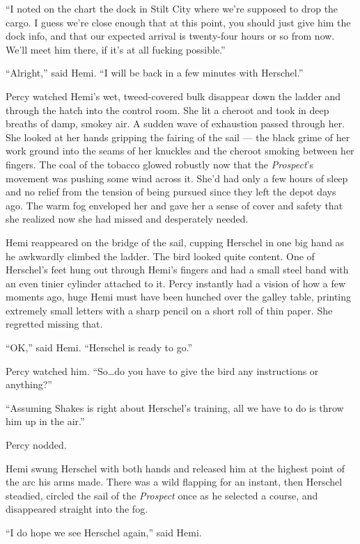 \documentclass[
]{scrbook}
\begin{document}
``I noted on the chart the dock in Stilt City where we're supposed to
drop the cargo. I guess we're close enough that at this point, you
should just give him the dock info, and that our expected arrival is
twenty-four hours or so from now. We'll meet him there, if it's at all
fucking possible.''

``Alright,'' said Hemi. ``I will be back in a few minutes with
Herschel.''

Percy watched Hemi's wet, tweed-covered bulk disappear down the ladder
and through the hatch into the control room. She lit a cheroot and took
in deep breaths of damp, smokey air. A sudden wave of exhaustion passed
through her. She looked at her hands gripping the fairing of the sail
--- the black grime of her work ground into the seams of her knuckles
and the cheroot smoking between her fingers. The coal of the tobacco
glowed robustly now that the \emph{Prospect}'s movement was pushing some
wind across it. She'd had only a few hours of sleep and no relief from
the tension of being pursued since they left the depot days ago. The
warm fog enveloped her and gave her a sense of cover and safety that she
realized now she had missed and desperately needed.

Hemi reappeared on the bridge of the sail, cupping Herschel in one big
hand as he awkwardly climbed the ladder. The bird looked quite content.
One of Herschel's feet hung out through Hemi's fingers and had a small
steel band with an even tinier cylinder attached to it. Percy instantly
had a vision of how a few moments ago, huge Hemi must have been hunched
over the galley table, printing extremely small letters with a sharp
pencil on a short roll of thin paper. She regretted missing that.

``OK,'' said Hemi. ``Herschel is ready to go.''

Percy watched him. ``So\ldots do you have to give the bird any
instructions or anything?''

``Assuming Shakes is right about Herschel's training, all we have to do
is throw him up in the air.''

Percy nodded.

Hemi swung Herschel with both hands and released him at the highest
point of the arc his arms made. There was a wild flapping for an
instant, then Herschel steadied, circled the sail of the \emph{Prospect}
once as he selected a course, and disappeared straight into the fog.

``I do hope we see Herschel again,'' said Hemi.
\end{document}
